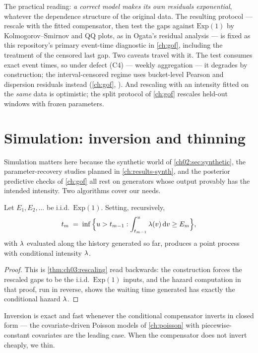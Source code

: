 The practical reading: \emph{a correct model makes its own residuals
exponential}, whatever the dependence structure of the original data. The
resulting protocol --- rescale with the fitted compensator, then test the
gaps against $\mathrm{Exp}(1)$ by Kolmogorov--Smirnov and QQ plots, as in
Ogata's residual analysis \citep{ogata1988} --- is fixed as this
repository's primary event-time diagnostic in \cref{ch:gof}, including
the treatment of the censored last gap. Two caveats travel with it. The
test consumes exact event times, so under defect (C4) --- weekly
aggregation --- it degrades by construction; the interval-censored regime
uses bucket-level Pearson and dispersion residuals instead
(\cref{ch:gof}, ). And rescaling with an intensity
fitted on the \emph{same} data is optimistic; the split protocol of
\cref{ch:gof} rescales held-out windows with frozen parameters.

\section{Simulation: inversion and thinning}\label{ch03:sec:simulation}

Simulation matters here because the synthetic world of
\cref{ch02:sec:synthetic}, the parameter-recovery studies planned in
\cref{ch:results-synth}, and the posterior predictive checks of
\cref{ch:gof} all rest on generators whose output provably has the
intended intensity. Two algorithms cover our needs.

\begin{corollary}\label{cor:ch03:inversion}
Let $E_1, E_2, \dots$ be i.i.d.\ $\mathrm{Exp}(1)$. Setting, recursively,
\[
t_m \;=\; \inf\Big\{u > t_{m-1} : \int_{t_{m-1}}^{u} \lambda(v)\,\mathrm{d} v \ge E_m\Big\},
\]
with $\lambda$ evaluated along the history generated so far, produces a point
process with conditional intensity $\lambda$.
\end{corollary}

\begin{proof}
This is \cref{thm:ch03:rescaling} read backwards: the construction forces
the rescaled gaps to be the i.i.d.\ $\mathrm{Exp}(1)$ inputs, and the
hazard computation in that proof, run in reverse, shows the waiting time
generated has exactly the conditional hazard $\lambda$.
\end{proof}

Inversion is exact and fast whenever the conditional compensator inverts
in closed form --- the covariate-driven Poisson models of
\cref{ch:poisson} with piecewise-constant covariates are the leading case.
When the compensator does not invert cheaply, we thin.

